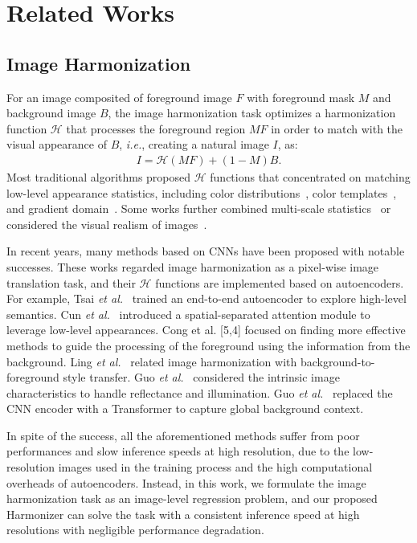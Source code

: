 \documentclass[runningheads]{llncs}
\begin{document}
\section{Related Works}

\subsection{Image Harmonization}

For an image composited of foreground image $F$ with foreground mask $M$ and background image $B$, the image harmonization task optimizes a harmonization function $\mathcal{H}$ that processes the foreground region $M F$ in order to match with the visual appearance of $B$, {\it i.e.}, creating a natural image $I$, as: 
\begin{equation}\label{eq:harmonization}
\begin{split}
I = \mathcal{H}( M F ) + (1 - M) B.
\end{split}
\end{equation}
Most traditional algorithms proposed $\mathcal{H}$ functions that concentrated on matching low-level appearance statistics, including color distributions~\cite{IHCD1,IHCD2,IHCD3,IHCD4}, color templates~\cite{IHCT1}, and gradient domain~\cite{IHGD1,IHGD2,IHGD3}. Some works further combined multi-scale statistics~\cite{IHMS1} or considered the visual realism of images~\cite{IHHV1,IHHV2}.


In recent years, many methods based on CNNs have been proposed with notable successes. These works regarded image harmonization as a pixel-wise image translation task, and their $\mathcal{H}$ functions are implemented based on autoencoders. For example, Tsai {\it et al.}~\cite{DIH} trained an end-to-end autoencoder to explore high-level semantics. Cun {\it et al.}~\cite{S2AM} introduced a spatial-separated attention module to leverage low-level appearances. Cong et al. [5,4] focused on finding more effective methods to guide the processing of the foreground using the information from the background.
Ling {\it et al.}~\cite{RAIN} related image harmonization with background-to-foreground style transfer. Guo {\it et al.}~\cite{IntrinsicIH} considered the intrinsic image characteristics to handle reflectance and illumination. Guo {\it et al.}~\cite{TransformerIH} replaced the CNN encoder with a Transformer to capture global background context. 

In spite of the success, all the aforementioned methods suffer from poor performances and slow inference speeds at high resolution, due to the low-resolution images used in the training process and the high computational overheads of autoencoders.
Instead, in this work, we formulate the image harmonization task as an image-level regression problem, and our proposed Harmonizer can solve the task with a consistent inference speed at high resolutions with negligible performance degradation. 
\end{document}
